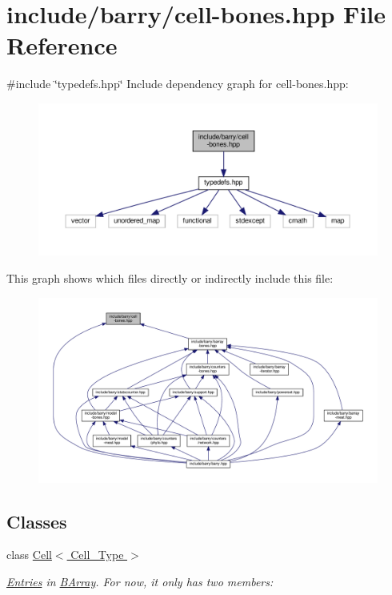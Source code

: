 \hypertarget{cell-bones_8hpp}{}\section{include/barry/cell-\/bones.hpp File Reference}
\label{cell-bones_8hpp}
{\ttfamily \#include \char`\"{}typedefs.\+hpp\char`\"{}}\newline
Include dependency graph for cell-\/bones.hpp\+:
\nopagebreak
\begin{figure}[H]
\begin{center}
\leavevmode
\includegraphics[width=350pt]{cell-bones_8hpp__incl}
\end{center}
\end{figure}
This graph shows which files directly or indirectly include this file\+:
\nopagebreak
\begin{figure}[H]
\begin{center}
\leavevmode
\includegraphics[width=350pt]{cell-bones_8hpp__dep__incl}
\end{center}
\end{figure}
\subsection*{Classes}
\begin{DoxyCompactItemize}
\item 
class \hyperlink{class_cell}{Cell$<$ Cell\+\_\+\+Type $>$}
\begin{DoxyCompactList}\small\item\em \hyperlink{class_entries}{Entries} in \hyperlink{class_b_array}{B\+Array}. For now, it only has two members\+: \end{DoxyCompactList}\end{DoxyCompactItemize}
